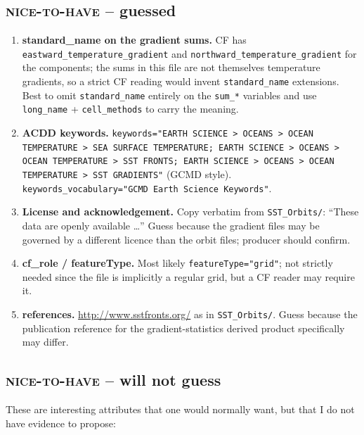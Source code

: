 \documentclass[11pt]{article}
\newcommand{\gs}{\textbf{guessed}}
\newcommand{\nc}{\textbf{will not guess}}
\newcommand{\nh}{\textsc{nice-to-have}}
\begin{document}
\subsection{\nh{} -- \gs{}}\label{sec:nh-gs}

\begin{enumerate}
  \item \textbf{standard\_name on the gradient sums.} CF has
    \texttt{eastward\_temperature\_gradient} and
    \texttt{northward\_temperature\_gradient} for the components;
    the sums in this file are not themselves temperature
    gradients, so a strict CF reading would invent
    \texttt{standard\_name} extensions. Best to omit
    \texttt{standard\_name} entirely on the \texttt{sum\_*}
    variables and use \texttt{long\_name} +
    \texttt{cell\_methods} to carry the meaning.
  \item \textbf{ACDD keywords.} \texttt{keywords="EARTH SCIENCE >
    OCEANS > OCEAN TEMPERATURE > SEA SURFACE TEMPERATURE; EARTH
    SCIENCE > OCEANS > OCEAN TEMPERATURE > SST FRONTS; EARTH
    SCIENCE > OCEANS > OCEAN TEMPERATURE > SST GRADIENTS"} (GCMD
    style).
    \texttt{keywords\_vocabulary="GCMD Earth Science Keywords"}.
  \item \textbf{License and acknowledgement.} Copy verbatim from
    \texttt{SST\_Orbits/}: ``These data are openly available
    \dots'' Guess because the gradient files may be governed by
    a different licence than the orbit files; producer should
    confirm.
  \item \textbf{cf\_role / featureType.} Most likely
    \texttt{featureType="grid"}; not strictly needed since the
    file is implicitly a regular grid, but a CF reader may
    require it.
  \item \textbf{references.} \url{http://www.sstfronts.org/} as in
    \texttt{SST\_Orbits/}. Guess because the publication
    reference for the gradient-statistics derived product
    specifically may differ.
\end{enumerate}

\subsection{\nh{} -- \nc{}}\label{sec:nh-nc}

These are interesting attributes that one would normally want, but
that I do not have evidence to propose:
\end{document}
